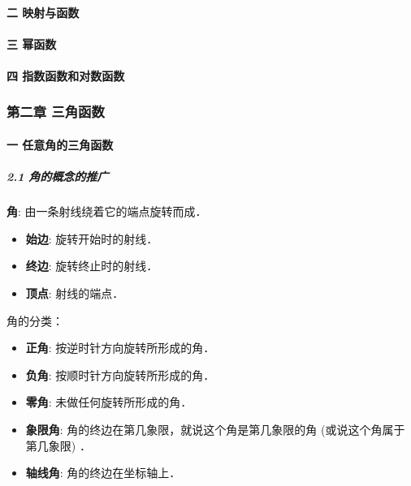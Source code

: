 \documentclass[
]{article}
\begin{document}
\hypertarget{ux4e8c--ux6620ux5c04ux4e0eux51fdux6570}{%
\paragraph{二 映射与函数}\label{ux4e8c--ux6620ux5c04ux4e0eux51fdux6570}}

\hypertarget{ux4e09--ux5e42ux51fdux6570}{%
\paragraph{三 幂函数}\label{ux4e09--ux5e42ux51fdux6570}}

\hypertarget{ux56db--ux6307ux6570ux51fdux6570ux548cux5bf9ux6570ux51fdux6570}{%
\paragraph{四
指数函数和对数函数}\label{ux56db--ux6307ux6570ux51fdux6570ux548cux5bf9ux6570ux51fdux6570}}

\hypertarget{ux7b2cux4e8cux7ae0--ux4e09ux89d2ux51fdux6570}{%
\subsubsection{第二章
三角函数}\label{ux7b2cux4e8cux7ae0--ux4e09ux89d2ux51fdux6570}}

\hypertarget{ux4e00--ux4efbux610fux89d2ux7684ux4e09ux89d2ux51fdux6570}{%
\paragraph{一
任意角的三角函数}\label{ux4e00--ux4efbux610fux89d2ux7684ux4e09ux89d2ux51fdux6570}}

\hypertarget{21--ux89d2ux7684ux6982ux5ff5ux7684ux63a8ux5e7f}{%
\subparagraph{2.1
角的概念的推广}\label{21--ux89d2ux7684ux6982ux5ff5ux7684ux63a8ux5e7f}}

\textbf{角}: 由一条射线绕着它的端点旋转而成．

\begin{itemize}
\item
  \textbf{始边}: 旋转开始时的射线．
\item
  \textbf{终边}: 旋转终止时的射线．
\item
  \textbf{顶点}: 射线的端点．
\end{itemize}

角的分类：

\begin{itemize}
\item
  \textbf{正角}: 按逆时针方向旋转所形成的角．
\item
  \textbf{负角}: 按顺时针方向旋转所形成的角．
\item
  \textbf{零角}: 未做任何旋转所形成的角．
\item
  \textbf{象限角}: 角的终边在第几象限，就说这个角是第几象限的角
  (或说这个角属于第几象限) ．
\item
  \textbf{轴线角}: 角的终边在坐标轴上．
\end{itemize}
\end{document}
